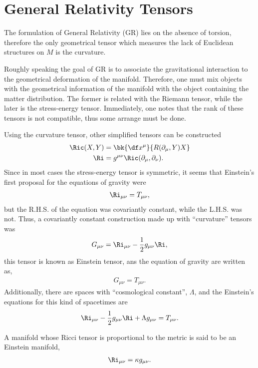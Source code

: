 \section{General Relativity Tensors}

The formulation of General Relativity (GR) lies on the absence of torsion, therefore the only geometrical tensor which measures the lack of Euclidean structures on $M$ is the curvature.

Roughly speaking the goal of GR is to associate the gravitational interaction to the geometrical deformation of the manifold. Therefore, one must mix objects with the geometrical information of the manifold with the object containing the matter distribution. The former is related with the Riemann tensor, while the later is the stress-energy tensor. Immediately, one notes that the rank of these tensors is not compatible, thus some arrange must be done.

Using the curvature tensor, other simplified tensors can be constructed
\begin{align}
  \Ric(X,Y) &= \bk{\df x^\mu}{R(\partial_\mu,Y)X}\\
  \Ri &= g^{\mu \nu}\Ric(\partial_\mu,\partial_\nu).
\end{align}
Since in most cases the stress-energy tensor is symmetric, it seems that Einstein's first proposal for the equations of gravity were
\begin{align}
  \Ri_{\mu\nu}=T_{\mu\nu},
\end{align}
but the R.H.S. of the equation was covariantly constant, while the L.H.S. was not. Thus, a covariantly constant construction made up with ``curvature'' tensors was
\begin{align}
  G_{\mu\nu} = \Ri_{\mu\nu}-\frac{1}{2}g_{\mu\nu}\Ri,
\end{align}
this tensor is known as Einstein tensor, ans the equation of gravity are written as,
\begin{align}
  G_{\mu\nu}= T_{\mu\nu}.
\end{align}
Additionally, there are spaces with ``cosmological constant'', $\Lambda$, and the Einstein's equations for this kind of spacetimes are
\begin{align}
  \Ri_{\mu\nu}-\frac{1}{2}g_{\mu\nu}\Ri + \Lambda g_{\mu\nu}= T_{\mu\nu}.
\end{align}

A manifold whose Ricci tensor is proportional to the metric is said to be an Einstein manifold,
\begin{align}
  \Ri_{\mu\nu} = \kappa g_{\mu\nu}.\label{def-const-curv}
\end{align}

